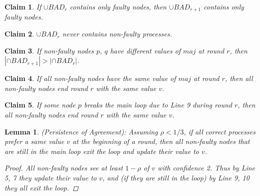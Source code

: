 \documentclass[conference]{IEEEtran}
\newtheorem{l1}{Lemma}
\newtheorem{claim*}{Claim}
\begin{document}
\begin{claim*}
If $\cup BAD_r$ contains only faulty nodes, then $\cup BAD_{r+1}$ contains only faulty nodes.
\end{claim*}

\begin{claim*}
$\cup BAD_r$ never contains non-faulty processes.
\end{claim*}


\begin{claim*}
If non-faulty nodes $p$, $q$ have different values of $maj$ at round $r$, then $|\cap BAD_{r+1}| > | \cap BAD_r|$.
\end{claim*}

\begin{claim*}
If all non-faulty nodes have the same value of $maj$ at round $r$, then all non-faulty nodes end round $r$ with the same value $v$.
\end{claim*}

\begin{claim*}
If some node $p$ breaks the main loop due to Line 9 during round $r$, then all non-faulty nodes end round $r$ with the same value $v$.
\end{claim*}

\begin{l1}
(Persistence of Agreement): Assuming $\rho < 1/3$, if all correct processes  
prefer a same value $v$ at the beginning of a round, then all non-faulty nodes that are still in the main loop exit the loop and update their value to $v$. 
\begin{proof}
All non-faulty nodes see at least $1 - \rho$ of $v$ with confidence 2. Thus by Line 5, 7 they update their value to $v$, and (if they are still in the loop) by Line 9, 10 they all exit the loop.
\end{proof}
\end{l1}
\end{document}
